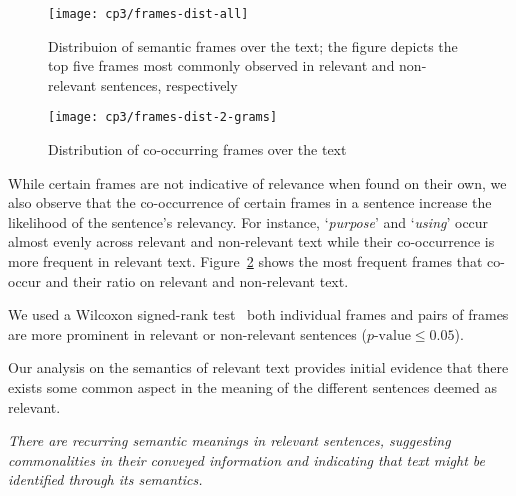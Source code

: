 \begin{figure}
\centering
\texttt{[image: cp3/frames-dist-all]}
\caption{Distribuion of semantic frames over the text; the figure depicts the top five frames most commonly observed in relevant and non-relevant sentences, respectively}
\label{fig:frame-distribution}
\end{figure}


\begin{figure}
\centering
\texttt{[image: cp3/frames-dist-2-grams]}
\caption{Distribution of co-occurring frames over the text}
\label{fig:frame-co-occurrence}
\end{figure}


While certain frames are not indicative of relevance when found on their own, we also observe that the co-occurrence of certain frames in a sentence increase the likelihood of the sentence's relevancy.
For instance, `\textit{purpose}' and `\textit{using}' occur almost evenly across relevant and non-relevant text
while their co-occurrence is more frequent in relevant text. 
Figure~\ref{fig:frame-co-occurrence} shows the most frequent frames that co-occur and their ratio on relevant and non-relevant text.


We used a Wilcoxon signed-rank test~\cite{wohlin2012}  both individual frames and pairs of frames 
are more prominent in relevant or non-relevant sentences ($p\text{-value} \le 0.05$).







Our analysis on the semantics of relevant text provides initial evidence that there exists some common aspect in the meaning of 
 the different sentences deemed as relevant.






\medskip
\begin{bluequote}
    \textit{There are recurring semantic meanings in relevant sentences,
    suggesting commonalities in their conveyed information
    and indicating that text might be identified through its semantics.}
\end{bluequote}



















    

